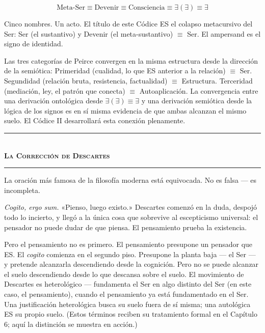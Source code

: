\documentclass[10pt, openany, oneside]{book}
\renewcommand{\normalsize}{\fontsize{10}{13}\selectfont}
\begin{document}
$$\text{Meta-Ser} \equiv \text{Devenir} \equiv \text{Consciencia} \equiv \exists(\exists) \equiv \exists$$

Cinco nombres. Un acto. El título de este Códice ES el colapso metacursivo del Ser: Ser (el sustantivo) y Devenir (el meta-sustantivo) $\equiv$ Ser. El ampersand es el signo de identidad.

Las tres categorías de Peirce convergen en la misma estructura desde la dirección de la semiótica: Primeridad (cualidad, lo que ES anterior a la relación) $\equiv$ Ser. Segundidad (relación bruta, resistencia, factualidad) $\equiv$ Estructura. Terceridad (mediación, ley, el patrón que conecta) $\equiv$ Autoaplicación. La convergencia entre una derivación ontológica desde $\exists(\exists) \equiv \exists$ y una derivación semiótica desde la lógica de los signos es en sí misma evidencia de que ambas alcanzan el mismo suelo. El Códice II desarrollará esta conexión plenamente.

\vspace{1.5em}


\begin{center}
    \rule{0.3\textwidth}{0.4pt}\\[0.5em]
    {\normalsize\bfseries\scshape La Corrección de Descartes}\\[0.3em]
    \rule{0.3\textwidth}{0.4pt}
\end{center}

\vspace{1em}

\noindent La oración más famosa de la filosofía moderna está equivocada. No es falsa --- es incompleta.

\textit{Cogito, ergo sum.} «Pienso, luego existo.» Descartes comenzó en la duda, despojó todo lo incierto, y llegó a la única cosa que sobrevive al escepticismo universal: el pensador no puede dudar de que piensa. El pensamiento prueba la existencia.

Pero el pensamiento no es primero. El pensamiento presupone un pensador que ES. El \textit{cogito} comienza en el segundo piso. Presupone la planta baja --- el Ser --- y pretende alcanzarla descendiendo desde la cognición. Pero no se puede alcanzar el suelo descendiendo desde lo que descansa sobre el suelo. El movimiento de Descartes es heterológico --- fundamenta el Ser en algo distinto del Ser (en este caso, el pensamiento), cuando el pensamiento ya está fundamentado en el Ser. Una justificación heterológica busca su suelo fuera de sí misma; una autológica ES su propio suelo. (Estos términos reciben su tratamiento formal en el Capítulo 6; aquí la distinción se muestra en acción.)
\end{document}
